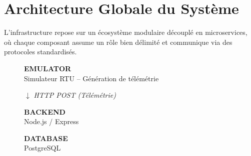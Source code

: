 \documentclass[11pt,a4paper]{article}
\begin{document}
\newpage

\section{Architecture Globale du Système}

L'infrastructure repose sur un écosystème modulaire découplé en microservices, où chaque composant assume un rôle bien délimité et communique via des protocoles standardisés.

\begin{figure}[H]
\centering
\begin{tcolorbox}[
    colback=bg-slate, colframe=slate-navy, boxrule=1.5pt, arc=6pt,
    title={\textbf{Diagramme d'architecture réseau -- Système NQMS}},
    fonttitle=\bfseries\color{white}, coltitle=white
]
\centering
\vspace{0.3cm}

\begin{tcolorbox}[colback=white, colframe=teal-accent, boxrule=1pt, arc=4pt,
    width=0.55\textwidth, halign=center]
    \centering
    {\small\bfseries\color{slate-navy} EMULATOR} \\
    {\footnotesize\color{text-slate} Simulateur RTU -- Génération de télémétrie}
\end{tcolorbox}

\vspace{0.15cm}
{\small $\downarrow$ \textit{HTTP POST (Télémétrie)}}
\vspace{0.15cm}

\begin{minipage}{0.5\textwidth}
\centering
\begin{tcolorbox}[colback=white, colframe=slate-navy, boxrule=1.5pt, arc=4pt]
    \centering
    {\small\bfseries\color{slate-navy} BACKEND} \\
    {\footnotesize\color{text-slate} Node.js / Express}
\end{tcolorbox}
\end{minipage}%
\hfill
\begin{minipage}{0.45\textwidth}
\centering
\begin{tcolorbox}[colback=white, colframe=teal-accent, boxrule=1pt, arc=4pt]
    \centering
    {\small\bfseries\color{teal-accent} DATABASE} \\
    {\footnotesize\color{text-slate} PostgreSQL}
\end{tcolorbox}
\end{minipage}


\end{tcolorbox}
\end{figure}
\end{document}
